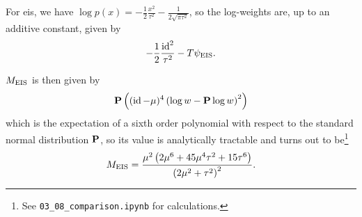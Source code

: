 For \acrshort{eis}, we have $\log p(x) = -\frac{1}{2} \frac{x^{2}}{\tau^{2}} - \frac{1}{2\sqrt{\pi\tau^{2}}}$, so the log-weights are, up to an additive constant, given by
$$
    - \frac{1}{2} \frac{\id^{2}}{\tau^{2}} - T \psi_{\eis}.
$$

$M_{\eis}$ is then given by 
$$
    \P \left( (\id - \mu)^{4} \left( \log w - \P \log w \right)^{2}  \right)
$$
which is the expectation of a sixth order polynomial with respect to the standard normal distribution $\P$, so its value is analytically tractable and turns out to be\footnote{See \texttt{03\_08\_comparison.ipynb} for calculations.}
$$ M_{\eis} = \frac{\mu^{2} \left(2 \mu^{6} + 45 \mu^{4} \tau^{2} + 15 \tau^{6}\right)}{\left(2 \mu^{2} + \tau^{2}\right)^{2}}.
$$


